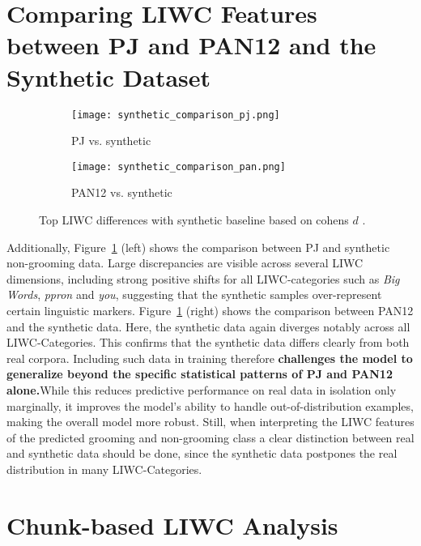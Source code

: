 \section{Comparing LIWC Features between PJ and PAN12 and the Synthetic Dataset} \label{sec:liwc_synthetic_comparison}
\begin{figure}[ht]
  \centering
  \begin{subfigure}[t]{0.48\textwidth}
    \texttt{[image: synthetic\_comparison\_pj.png]}
    \caption{PJ vs. synthetic}
  \end{subfigure}\hfill
  \begin{subfigure}[t]{0.48\textwidth}
    \texttt{[image: synthetic\_comparison\_pan.png]}
    \caption{PAN12 vs. synthetic}
  \end{subfigure}
  \caption[Top 30 LIWC Differences with Synthetic Baseline]{Top LIWC differences with synthetic baseline based on cohens $d$ \cite{cohen1988}.}
  \label{fig:liwc_synth_side_by_side}
\end{figure}



Additionally, Figure~\ref{fig:liwc_synth_side_by_side} (left) shows the comparison between PJ and synthetic non-grooming data. Large discrepancies are visible across several LIWC dimensions, including strong positive shifts for all LIWC-categories such as \textit{Big Words}, \textit{ppron} and \textit{you}, suggesting that the synthetic samples over-represent certain linguistic markers.  Figure~\ref{fig:liwc_synth_side_by_side} (right) shows the comparison between PAN12 and the synthetic data. Here, the synthetic data again diverges notably across all LIWC-Categories. This confirms that the synthetic data differs clearly from both real corpora. Including such data in training therefore \textbf{challenges the model to generalize beyond the specific statistical patterns of PJ and PAN12 alone.}While this reduces predictive performance on real data in isolation only marginally, it improves the model’s ability to handle out-of-distribution examples, making the overall model more robust. Still, when interpreting the LIWC features of the predicted grooming and non-grooming class a clear distinction between real and synthetic data should be done, since the synthetic data postpones the real distribution in many LIWC-Categories.


\section{Chunk-based LIWC Analysis} \label{sec:chunk_based_liwc_analysis}


